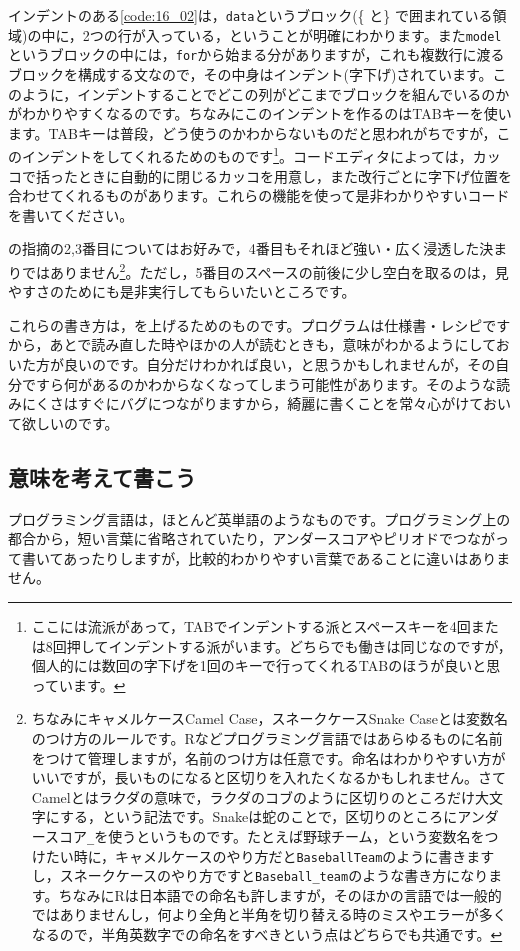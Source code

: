 \documentclass{ltjsbook}
\begin{document}
インデントのある\ref{code:16_02}は，\texttt{data}というブロック(\{ と\} で囲まれている領域)の中に，2つの行が入っている，ということが明確にわかります。また\texttt{model}というブロックの中には，\texttt{for}から始まる分がありますが，これも複数行に渡るブロックを構成する文なので，その中身はインデント(字下げ)されています。このように，インデントすることでどこの列がどこまでブロックを組んでいるのかがわかりやすくなるのです。ちなみにこのインデントを作るのはTABキーを使います。TABキーは普段，どう使うのかわからないものだと思われがちですが，このインデントをしてくれるためのものです\footnote{ここには流派があって，TABでインデントする派とスペースキーを4回または8回押してインデントする派がいます。どちらでも働きは同じなのですが，個人的には数回の字下げを1回のキーで行ってくれるTABのほうが良いと思っています。}。コードエディタによっては，カッコで括ったときに自動的に閉じるカッコを用意し，また改行ごとに字下げ位置を合わせてくれるものがあります。これらの機能を使って是非わかりやすいコードを書いてください。

\textcite{Matsuura201610}の指摘の2,3番目についてはお好みで，4番目もそれほど強い・広く浸透した決まりではありません\footnote{ちなみにキャメルケースCamel Case，スネークケースSnake Caseとは変数名のつけ方のルールです。Rなどプログラミング言語ではあらゆるものに名前をつけて管理しますが，名前のつけ方は任意です。命名はわかりやすい方がいいですが，長いものになると区切りを入れたくなるかもしれません。さてCamelとはラクダの意味で，ラクダのコブのように区切りのところだけ大文字にする，という記法です。Snakeは蛇のことで，区切りのところにアンダースコア\verb|_|を使うというものです。たとえば野球チーム，という変数名をつけたい時に，キャメルケースのやり方だと\texttt{BaseballTeam}のように書きますし，スネークケースのやり方ですと\verb|Baseball_team|のような書き方になります。ちなみにRは日本語での命名も許しますが，そのほかの言語では一般的ではありませんし，何より全角と半角を切り替える時のミスやエラーが多くなるので，半角英数字での命名をすべきという点はどちらでも共通です。}。ただし，5番目のスペースの前後に少し空白を取るのは，見やすさのためにも是非実行してもらいたいところです。

これらの書き方は，を上げるためのものです。プログラムは仕様書・レシピですから，あとで読み直した時やほかの人が読むときも，意味がわかるようにしておいた方が良いのです。自分だけわかれば良い，と思うかもしれませんが，その自分ですら何があるのかわからなくなってしまう可能性があります。そのような読みにくさはすぐにバグにつながりますから，綺麗に書くことを常々心がけておいて欲しいのです。

\subsection{意味を考えて書こう}
プログラミング言語は，ほとんど英単語のようなものです。プログラミング上の都合から，短い言葉に省略されていたり，アンダースコアやピリオドでつながって書いてあったりしますが，比較的わかりやすい言葉であることに違いはありません。
\end{document}
